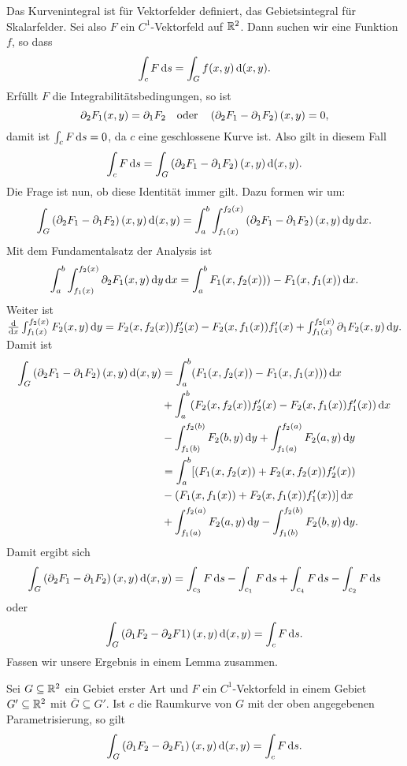 \documentclass[
pdftex,
oneside,
headsepline,
11pt, 
]{scrreprt}
\begin{document}
Das Kurvenintegral ist für Vektorfelder definiert, das Gebietsintegral für Skalarfelder. Sei also $F$ ein $C^1$-Vektorfeld auf $\mathbb{R}^2$. Dann suchen wir eine Funktion $f$, so dass \[ \int_c F \mathop{}\!\mathrm{d} s=\int_G f(x,y)\mathop{}\!\mathrm{d}(x,y). \]
Erfüllt $F$ die Integrabilitätsbedingungen, so ist \[\partial_2 F_1(x,y)=\partial_1F_2 \quad \textnormal{oder} \quad \left(  \partial_2F_1-\partial_1F_2 \right)(x,y)=0,\] damit ist $\int_c F\mathop{}\!\mathrm{d} s=0$, da $c$ eine geschlossene Kurve ist. Also gilt in diesem Fall \[ \int_c F\mathop{}\!\mathrm{d} s=\int_G  \left(  \partial_2F_1-\partial_1F_2 \right)(x,y) \mathop{}\!\mathrm{d}(x,y).\] Die Frage ist nun, ob diese Identität immer gilt. Dazu formen wir um: \[ \int_G  \left(  \partial_2F_1-\partial_1F_2 \right)(x,y) \mathop{}\!\mathrm{d}(x,y)=\int_a^b\int_{f_1(x)}^{f_2(x)}\left( \partial_2F_1-\partial_1F_2 \right)(x,y)\mathop{}\!\mathrm{d} y\mathop{}\!\mathrm{d} x. \]
Mit dem Fundamentalsatz der Analysis ist \[  \int_a^b \int_{f_1(x)}^{f_2(x)}\partial_2 F_1(x,y)\mathop{}\!\mathrm{d} y\mathop{}\!\mathrm{d} x=\int_a^b F_1(x,f_2(x)))-F_1(x,f_1(x))\mathop{}\!\mathrm{d} x.\] Weiter ist $\frac{\mathop{}\!\mathrm{d}}{\mathop{}\!\mathrm{d} x}\int_{f_1(x)}^{f_2(x)}F_2(x,y)\mathop{}\!\mathrm{d} y=F_2(x,f_2(x))f'_2(x)-F_2(x,f_1(x))f'_1(x)+\int_{f_1(x)}^{f_2(x)}\partial_1 F_2(x,y)\mathop{}\!\mathrm{d} y.$ Damit ist 
\begin{align*}
\int_G \left( \partial_2F_1-\partial_1F_2 \right)(x,y)\diff(x,y)&=\int_a^b(F_1(x,f_2(x))-F_1(x,f_1(x)))\diff x\\
&+\int_a^b(F_2(x,f_2(x))f'_2(x)-F_2(x,f_1(x))f'_1(x))\diff x\\
&-\int_{f_1(b)}^{f_2(b)}F_2(b,y)\diff y+\int_{f_1(a)}^{f_2(a)}F_2(a,y)\diff y\\
&=\int_a^b[(F_1(x,f_2(x))+F_2(x,f_2(x))f'_2(x))\\&-(F_1(x,f_1(x))+F_2(x,f_1(x))f'_1(x))]\diff x\\
&+\int_{f_1(a)}^{f_2(a)}F_2(a,y)\diff y-\int_{f_1(b)}^{f_2(b)}F_2(b,y)\diff y.
\end{align*}
Damit ergibt sich \[\int_G \left(  \partial_2 F_1-\partial_1 F_2 \right)(x,y)\mathop{}\!\mathrm{d}(x,y)=\int_{c_3}F\mathop{}\!\mathrm{d} s-\int_{c_1}F\mathop{}\!\mathrm{d} s+\int_{c_4}F\mathop{}\!\mathrm{d} s-\int_{c_2}F\mathop{}\!\mathrm{d} s \] oder \[ \int_G\left(  \partial_1F_2-\partial_2F1 \right)(x,y)\mathop{}\!\mathrm{d}(x,y)=\int_c F \mathop{}\!\mathrm{d} s. \]
Fassen wir unsere Ergebnis in einem Lemma zusammen. 
\begin{lem}
	Sei $G\subseteq \mathbb{R}^2$ ein Gebiet erster Art und $F$ ein  $C^1$-Vektorfeld in einem Gebiet $G'\subseteq \mathbb{R}^2$ mit $\overline{G}\subseteq G'$. Ist $c$ die Raumkurve von $G$ mit der oben angegebenen Parametrisierung, so gilt \[  \int_G \left(  \partial_1 F_2-\partial_2F_1 \right)(x,y)\mathop{}\!\mathrm{d} (x,y)=\int_c F \mathop{}\!\mathrm{d} s. \]
\end{lem}
\end{document}
